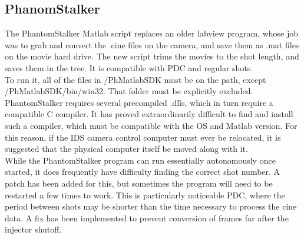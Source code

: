 \documentclass[twoside]{article}
\begin{document}
\subsection{PhanomStalker}
\hspace{4ex}The PhantomStalker Matlab script replaces an older labview program, whose job was to grab and convert the .cine files on the camera, and save them as .mat files on the movie hard drive. The new script trims the movies to the shot length, and saves them in the tree. It is compatible with PDC and regular shots. \\
\hspace*{4ex}To run it, all of the files in /PhMatlabSDK must be on the path, except /PhMatlabSDK/bin/win32. That folder must be explicitly excluded. \\
\hspace*{4ex}PhantomStalker requires several precompiled .dlls, which in turn require a compatible C compiler. It has proved extraordinarily difficult to find and install such a compiler, which must be compatible with the OS and Matlab version. For this reason, if the IDS camera control computer must ever be relocated, it is suggested that the physical computer itself be moved along with it.\\
\hspace*{4ex}While the PhantomStalker program can run essentially autonomously once started, it does frequently have difficulty finding the correct shot number. A patch has been added for this, but sometimes the program will need to be restarted a few times to work. This is particularly noticeable PDC, where the period between shots may be shorter than the time necessary to process the cine data. A fix has been implemented to prevent conversion of frames far after the injector shutoff. 
\end{document}
